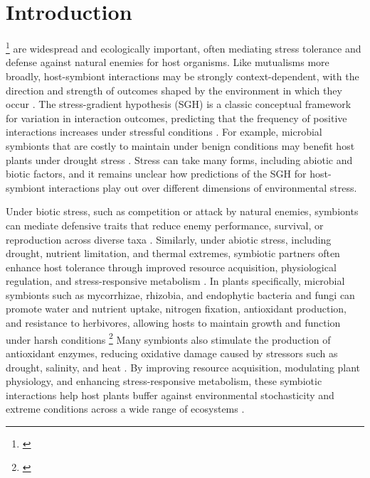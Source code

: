 \documentclass[12pt]{article}\usepackage[]{graphicx}\usepackage[dvipsnames]{xcolor}
\newcommand{\tom}[2]{{\color{red}{#1}}\footnote{\textit{\color{red}{#2}}}}
\begin{document}
\section*{Introduction}
\tom{Mutualistic symbioses}{It seems like your introduction is actually about symbiosis and not mutualism per se, so I have tried to add clarity.} are widespread and ecologically important, often mediating stress tolerance and defense against natural enemies for host organisms. 
Like mutualisms more broadly, host-symbiont interactions may be strongly context-dependent, with the direction and strength of outcomes shaped by the environment in which they occur \citep{hoeksema2015context, bronstein1994conditional,hoang2024impacts,rudgers2020climate}. 
The stress-gradient hypothesis (SGH) is a classic conceptual framework for variation in interaction outcomes, predicting that the frequency of positive interactions increases under stressful conditions \citep{louthan2015and,bertness1994positive,holmgren2010strong,maestre2009refining}.
For example, microbial symbionts that are costly to maintain under benign conditions may benefit host plants under drought stress  \citep{giauque2019endophyte}. 
Stress can take many forms, including abiotic and biotic factors, and it remains unclear how predictions of the SGH for host-symbiont interactions play out over different dimensions of environmental stress. 

Under biotic stress, such as competition or attack by natural enemies, symbionts can mediate defensive traits that reduce enemy performance, survival, or reproduction across diverse taxa \citep{atala2022fungal,bastias2017epichloe,vega2008insect,haine2008symbiont,florez2015defensive}.
Similarly, under abiotic stress, including drought, nutrient limitation, and thermal extremes, symbiotic partners often enhance host tolerance through improved resource acquisition, physiological regulation, and stress-responsive metabolism \citep{clay2002evolutionary, afkhami2008symbiosis,cesar2024defensive}. 
In plants specifically, microbial symbionts such as mycorrhizae, rhizobia, and endophytic bacteria and fungi can promote water and nutrient uptake, nitrogen fixation, antioxidant production, and resistance to herbivores, allowing hosts to maintain growth and function under harsh conditions \tom{\citep{amijee1989development}.}{I would beef up references to match the content of this sentence.}
Many symbionts also stimulate the production of antioxidant enzymes, reducing oxidative damage caused by stressors such as drought, salinity, and heat \citep{ruiz1996superoxide}. 
By improving resource acquisition, modulating plant physiology, and enhancing stress-responsive metabolism, these symbiotic interactions help host plants buffer against environmental stochasticity and extreme conditions across a wide range of ecosystems \citep{fowler2023geographic,rudgers2020climate,li2026climate}.
\end{document}
